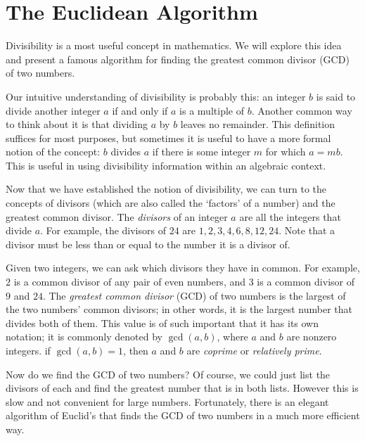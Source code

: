 \documentclass[a4paper,twocolumn]{article}
\begin{document}

\section*{The Euclidean Algorithm}

Divisibility is a most useful concept in mathematics.
We will explore this idea and present a famous algorithm for finding the
greatest common divisor (GCD) of two numbers. 

Our intuitive understanding of divisibility is probably this: an
integer $b$ is said to divide another integer $a$ if and only if
$a$ is a multiple of $b$. 
Another common way to think about it is that dividing $a$ by $b$
leaves no remainder. This definition suffices for most purposes,
but sometimes it is useful to have a more formal notion of the concept:
$b$ divides $a$ if there is some integer $m$ for which $a=mb$. This
is useful in using divisibility information within an algebraic context.

Now that we have established the notion of
divisibility, we can turn to the concepts of divisors (which are also
called the `factors' of a number) and the greatest common divisor.
The \emph{divisors} of an integer $a$ are all the integers that divide $a$.
For example, the divisors of $24$ are $1,2,3,4,6,8,12,24$. Note that a divisor must
be less than or equal to the number it is a divisor of.

Given two integers, we can ask which divisors they have in common.
For example, $2$ is a common divisor of any pair of even numbers, and $3$ is
a common divisor of $9$ and $24$. The \emph{greatest common divisor} (GCD) of
two numbers is the largest of the two numbers' common divisors; in other words,
it is the largest number that divides both of them. This value is of such
important that it has its own notation; it is commonly denoted by $\gcd(a,b)$, where
$a$ and $b$ are nonzero integers. if $\gcd(a,b)=1$, then $a$ and $b$ are \emph{coprime}
or \emph{relatively prime}.

Now do we find the GCD of two numbers? Of course, we could just list the divisors
of each and find the greatest number that is in both lists. However this is slow
and not convenient for large numbers. Fortunately, there is an elegant algorithm of
Euclid's that finds the GCD of two numbers in a much more efficient way.
\end{document}
